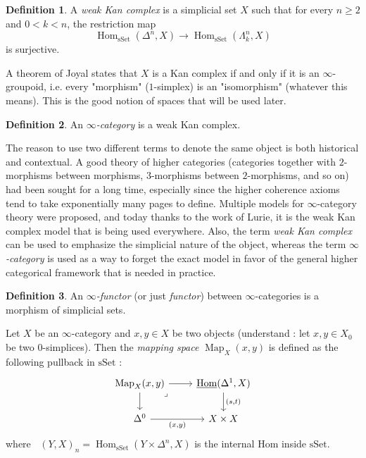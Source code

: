 \documentclass[11pt]{article}
\theoremstyle{definition}
\newtheorem{definition}{Definition}
\newcommand{\sSet}{\mathrm{sSet}}
\DeclareMathOperator{\Hom}{Hom}
\DeclareMathOperator{\Map}{Map}
\DeclareMathOperator{\iHom}{\underline{Hom}}
\begin{document}
\begin{definition}
    A \emph{weak Kan complex} is a simplicial set $X$ such that for every $n \geq 2$ and $0 < k < n$, the restriction map
    $$\Hom_{\sSet}(\Delta^n, X) \to \Hom_{\sSet}(\Lambda_k^n, X)$$
    is surjective.
\end{definition}

A theorem of Joyal states that $X$ is a Kan complex if and only if it is an $\infty$-groupoid, i.e. every "morphism" ($1$-simplex) is an "isomorphism" (whatever this means). This is the good notion of spaces that will be used later.

\begin{definition}
    An \emph{$\infty$-category} is a weak Kan complex.
\end{definition}

The reason to use two different terms to denote the same object is both historical and contextual. A good theory of higher categories (categories together with $2$-morphisms between morphisms, $3$-morphisms between $2$-morphisms, and so on) had been sought for a long time, especially since the higher coherence axioms tend to take exponentially many pages to define. Multiple models for $\infty$-category theory were proposed, and today thanks to the work of Lurie, it is the weak Kan complex model that is being used everywhere. Also, the term \emph{weak Kan complex} can be used to emphasize the simplicial nature of the object, whereas the term \emph{$\infty$-category} is used as a way to forget the exact model in favor of the general higher categorical framework that is needed in practice.

\begin{definition}
    An \emph{$\infty$-functor} (or just \emph{functor}) between $\infty$-categories is a morphism of simplicial sets.
\end{definition}

Let $X$ be an $\infty$-category and $x, y \in X$ be two objects (understand : let $x, y \in X_0$ be two $0$-simplices). Then the \emph{mapping space} $\Map_X(x, y)$ is defined as the following pullback in $\sSet$ :
\[\begin{tikzcd}
	{\Map_X(x, y)} & {\iHom(\Delta^1, X)} \\
	{\Delta^0} & {X\times X}
	\arrow[from=1-1, to=1-2]
	\arrow[from=1-1, to=2-1]
	\arrow["\lrcorner"{anchor=center, pos=0.125}, draw=none, from=1-1, to=2-2]
	\arrow["{(s, t)}", from=1-2, to=2-2]
	\arrow["{(x, y)}"', from=2-1, to=2-2]
\end{tikzcd}\]
where $\iHom(Y, X)_n = \Hom_{\sSet}(Y \times \Delta^n, X)$ is the internal Hom inside $\sSet$.
\end{document}
